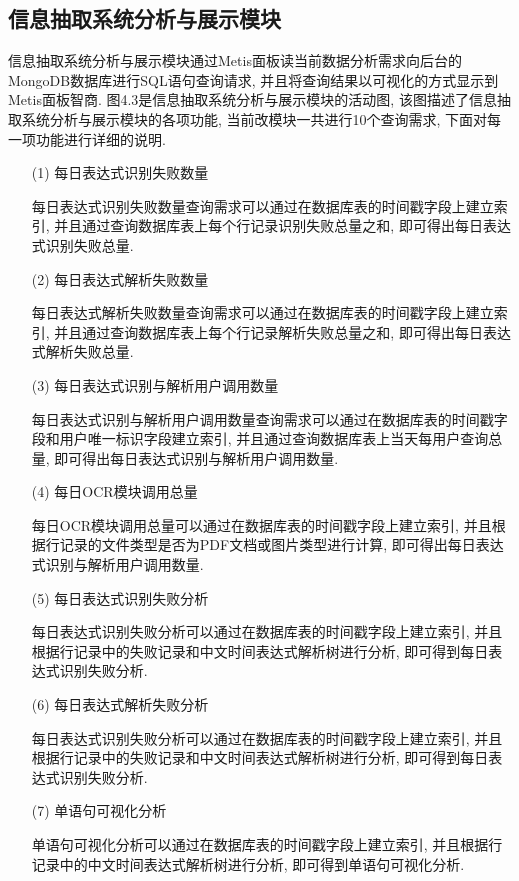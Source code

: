 \subsection{信息抽取系统分析与展示模块}

信息抽取系统分析与展示模块通过Metis面板读当前数据分析需求向后台的MongoDB数据库进行SQL语句查询请求, 并且将查询结果以可视化的方式显示到Metis面板智商.
图4.3是信息抽取系统分析与展示模块的活动图, 该图描述了信息抽取系统分析与展示模块的各项功能, 当前改模块一共进行10个查询需求, 下面对每一项功能进行详细的说明.

\begin{enumerate}
  \item[(1)] 每日表达式识别失败数量

    每日表达式识别失败数量查询需求可以通过在数据库表的时间戳字段上建立索引, 并且通过查询数据库表上每个行记录识别失败总量之和, 即可得出每日表达式识别失败总量.

  \item[(2)] 每日表达式解析失败数量

    每日表达式解析失败数量查询需求可以通过在数据库表的时间戳字段上建立索引, 并且通过查询数据库表上每个行记录解析失败总量之和, 即可得出每日表达式解析失败总量.

  \item[(3)] 每日表达式识别与解析用户调用数量

    每日表达式识别与解析用户调用数量查询需求可以通过在数据库表的时间戳字段和用户唯一标识字段建立索引, 并且通过查询数据库表上当天每用户查询总量, 即可得出每日表达式识别与解析用户调用数量.

  \item[(4)] 每日OCR模块调用总量

    每日OCR模块调用总量可以通过在数据库表的时间戳字段上建立索引, 并且根据行记录的文件类型是否为PDF文档或图片类型进行计算, 即可得出每日表达式识别与解析用户调用数量.

  \item[(5)] 每日表达式识别失败分析

    每日表达式识别失败分析可以通过在数据库表的时间戳字段上建立索引, 并且根据行记录中的失败记录和中文时间表达式解析树进行分析, 即可得到每日表达式识别失败分析.

  \item[(6)] 每日表达式解析失败分析

    每日表达式识别失败分析可以通过在数据库表的时间戳字段上建立索引, 并且根据行记录中的失败记录和中文时间表达式解析树进行分析, 即可得到每日表达式识别失败分析.

  \item[(7)] 单语句可视化分析

    单语句可视化分析可以通过在数据库表的时间戳字段上建立索引, 并且根据行记录中的中文时间表达式解析树进行分析, 即可得到单语句可视化分析.
\end{enumerate}


